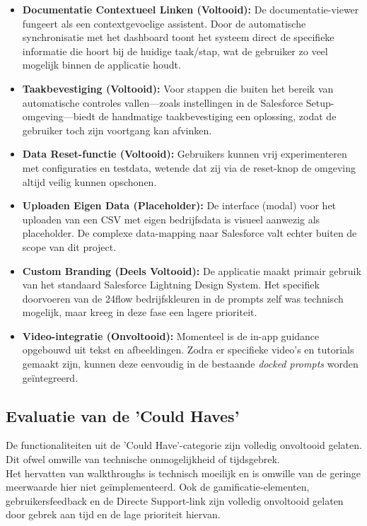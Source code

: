 \begin{itemize}
	\item \textbf{Documentatie Contextueel Linken (Voltooid):} De documentatie-viewer fungeert als een contextgevoelige assistent. Door de automatische synchronisatie met het dashboard toont het systeem direct de specifieke informatie die hoort bij de huidige taak/stap, wat de gebruiker zo veel mogelijk binnen de applicatie houdt.
	\item \textbf{Taakbevestiging (Voltooid):} Voor stappen die buiten het bereik van automatische controles vallen—zoals instellingen in de Salesforce Setup-omgeving—biedt de handmatige taakbevestiging een oplossing, zodat de gebruiker toch zijn voortgang kan afvinken.
	\item \textbf{Data Reset-functie (Voltooid):} Gebruikers kunnen vrij experimenteren met configuraties en testdata, wetende dat zij via de reset-knop de omgeving altijd veilig kunnen opschonen.
	\item \textbf{Uploaden Eigen Data (Placeholder):} De interface (modal) voor het uploaden van een CSV met eigen bedrijfsdata is visueel aanwezig als placeholder. De complexe data-mapping naar Salesforce valt echter buiten de scope van dit project.
	\item \textbf{Custom Branding (Deels Voltooid):} De applicatie maakt primair gebruik van het standaard Salesforce Lightning Design System. Het specifiek doorvoeren van de 24flow bedrijfskleuren in de prompts zelf was technisch mogelijk, maar kreeg in deze fase een lagere prioriteit.
	\item \textbf{Video-integratie (Onvoltooid):} Momenteel is de in-app guidance opgebouwd uit tekst en afbeeldingen. Zodra er specifieke video's en tutorials gemaakt zijn, kunnen deze eenvoudig in de bestaande \textit{docked prompts} worden geïntegreerd.
\end{itemize}

\subsection{Evaluatie van de 'Could Haves'}
De functionaliteiten uit de 'Could Have'-categorie zijn volledig onvoltooid gelaten. Dit ofwel omwille van technische onmogelijkheid of tijdsgebrek. 
\\

Het hervatten van walkthroughs is technisch moeilijk en is omwille van de geringe meerwaarde hier niet geïmplementeerd. Ook de gamificatie-elementen, gebruikersfeedback en de Directe Support-link zijn volledig onvoltooid gelaten door gebrek aan tijd en de lage prioriteit hiervan. 
\\


